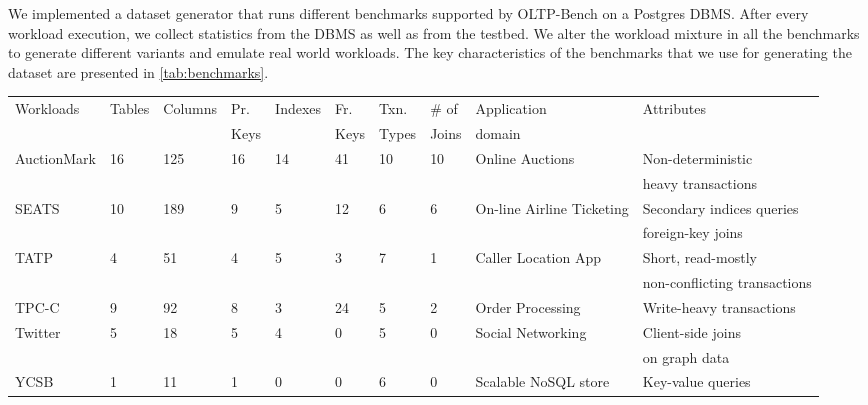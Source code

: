 We implemented a dataset generator that runs different benchmarks supported
by OLTP-Bench on a Postgres DBMS. After every workload execution, we
collect statistics from the DBMS as well as from the testbed. We alter the
workload mixture in all the benchmarks to generate different variants and
emulate real world workloads. The key characteristics of the benchmarks
that we use for generating the dataset are presented in \cref{tab:benchmarks}.

\begin{table*}
\centering
\small{
  \centering
  \begin{tabular}{lllll lllll} \toprule
   Workloads & Tables & Columns & Pr. & Indexes &	Fr. & 
   Txn. & \# of & Application  & Attributes  \\
   & & & Keys & & Keys & Types & Joins  & domain & \\
   \midrule
	AuctionMark 	& 16 	& 125  &	16 &	14 &	41 &	10 &	10 &	Online Auctions &
	Non-deterministic\\
	& & & & & & & & &  heavy transactions \\
	SEATS &	10 &	189 &	9 	& 5 	& 12 	& 6 &	6 &	On-line Airline Ticketing &
	Secondary indices queries\\
	& & & & & & & & & foreign-key joins \\
	TATP &	4 	& 51 &	4 &	5 &	3 &	7 &	1 &	Caller Location App &	Short, read-mostly\\
	& & & & & & & & & non-conflicting transactions\\
	TPC-C &	9 &	92 &	8 &	3 &	24 &	5 &	2 &	Order Processing & Write-heavy
	transactions\\
	Twitter &	5 &	18 &	5 &	4 &	0 &	5 &	0 &	Social Networking & Client-side joins \\
	& & & & & & & & & on	graph data \\
	YCSB &	1 &	11 &	1 &	0 &	0 &	6 &	0 &	Scalable NoSQL store &	Key-value queries \\
   \bottomrule
   \end{tabular}
 }
\caption{Key characteristics of the benchmarks used in our evaluation. ``Pr. key''
denotes primary key and ``Fr. key'' denotes foreign key.}
\label{tab:benchmarks}
\end{table*}


